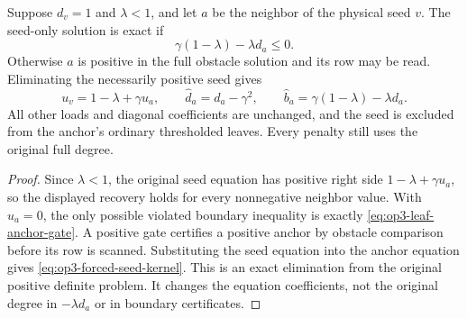 \begin{lemma}
\label{lem:op3-multipartite-leaf-seed}
Suppose $d_v=1$ and $\lambda<1$, and let $a$ be the neighbor of the
physical seed $v$. The seed-only solution is exact if
\begin{equation}
 \gamma(1-\lambda)-\lambda d_a\leq0.
 \label{eq:op3-leaf-anchor-gate}
\end{equation}
Otherwise $a$ is positive in the full obstacle solution and its row may
be read. Eliminating the necessarily positive seed gives
\begin{equation}
 u_v=1-\lambda+\gamma u_a,\qquad
 \widehat d_a=d_a-\gamma^2,\qquad
 \widehat b_a=\gamma(1-\lambda)-\lambda d_a.
 \label{eq:op3-forced-seed-kernel}
\end{equation}
All other loads and diagonal coefficients are unchanged, and the seed is
excluded from the anchor's ordinary thresholded leaves. Every penalty
still uses the original full degree.
\end{lemma}
\begin{proof}
Since $\lambda<1$, the original seed equation has positive right side
$1-\lambda+\gamma u_a$, so the displayed recovery holds for every
nonnegative neighbor value. With $u_a=0$, the only possible violated
boundary inequality is exactly \cref{eq:op3-leaf-anchor-gate}. A positive
gate certifies a positive anchor by obstacle comparison before its row is
scanned. Substituting the seed equation into the anchor equation gives
\cref{eq:op3-forced-seed-kernel}. This is an exact elimination from the
original positive definite problem. It changes the equation coefficients,
not the original degree in $-\lambda d_a$ or in boundary certificates.
\end{proof}

